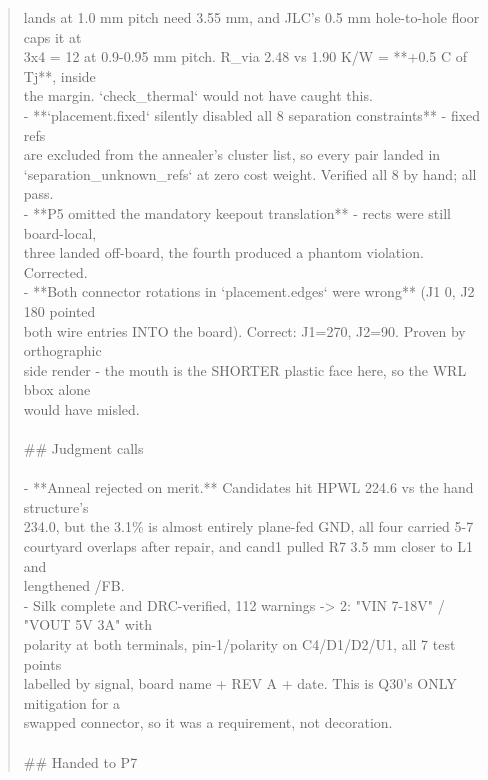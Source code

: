 \documentclass[11pt,a4paper]{article}
\begin{document}
\begin{quote}
  lands at 1.0 mm pitch need 3.55 mm, and JLC's 0.5 mm hole-to-hole floor caps it at\\
  3x4 = 12 at 0.9-0.95 mm pitch. R\_via 2.48 vs 1.90 K/W = {*}{*}+0.5 C of Tj{*}{*}, inside\\
  the margin. `check\_thermal` would not have caught this.\\
- {*}{*}`placement.fixed` silently disabled all 8 separation constraints{*}{*} - fixed refs\\
  are excluded from the annealer's cluster list, so every pair landed in\\
  `separation\_unknown\_refs` at zero cost weight. Verified all 8 by hand; all pass.\\
- {*}{*}P5 omitted the mandatory keepout translation{*}{*} - rects were still board-local,\\
  three landed off-board, the fourth produced a phantom violation. Corrected.\\
- {*}{*}Both connector rotations in `placement.edges` were wrong{*}{*} (J1 0, J2 180 pointed\\
  both wire entries INTO the board). Correct: J1=270, J2=90. Proven by orthographic\\
  side render - the mouth is the SHORTER plastic face here, so the WRL bbox alone\\
  would have misled.\\
~\\
\#\# Judgment calls\\
~\\
- {*}{*}Anneal rejected on merit.{*}{*} Candidates hit HPWL 224.6 vs the hand structure's\\
  234.0, but the 3.1\% is almost entirely plane-fed GND, all four carried 5-7\\
  courtyard overlaps after repair, and cand1 pulled R7 3.5 mm closer to L1 and\\
  lengthened /FB.\\
- Silk complete and DRC-verified, 112 warnings -\textgreater{} 2: "VIN 7-18V" / "VOUT 5V 3A" with\\
  polarity at both terminals, pin-1/polarity on C4/D1/D2/U1, all 7 test points\\
  labelled by signal, board name + REV A + date. This is Q30's ONLY mitigation for a\\
  swapped connector, so it was a requirement, not decoration.\\
~\\
\#\# Handed to P7\\

\end{quote}
\end{document}
